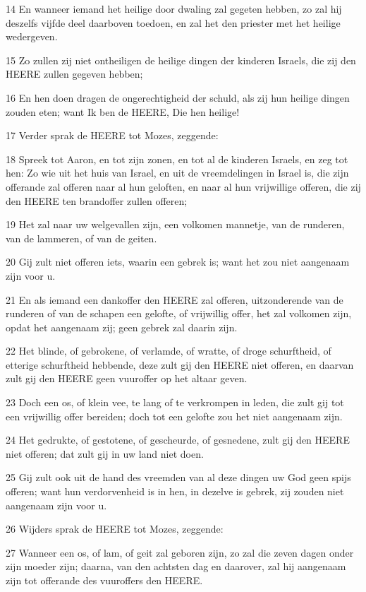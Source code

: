 \par 14 En wanneer iemand het heilige door dwaling zal gegeten hebben, zo zal hij deszelfs vijfde deel daarboven toedoen, en zal het den priester met het heilige wedergeven.
\par 15 Zo zullen zij niet ontheiligen de heilige dingen der kinderen Israels, die zij den HEERE zullen gegeven hebben;
\par 16 En hen doen dragen de ongerechtigheid der schuld, als zij hun heilige dingen zouden eten; want Ik ben de HEERE, Die hen heilige!
\par 17 Verder sprak de HEERE tot Mozes, zeggende:
\par 18 Spreek tot Aaron, en tot zijn zonen, en tot al de kinderen Israels, en zeg tot hen: Zo wie uit het huis van Israel, en uit de vreemdelingen in Israel is, die zijn offerande zal offeren naar al hun geloften, en naar al hun vrijwillige offeren, die zij den HEERE ten brandoffer zullen offeren;
\par 19 Het zal naar uw welgevallen zijn, een volkomen mannetje, van de runderen, van de lammeren, of van de geiten.
\par 20 Gij zult niet offeren iets, waarin een gebrek is; want het zou niet aangenaam zijn voor u.
\par 21 En als iemand een dankoffer den HEERE zal offeren, uitzonderende van de runderen of van de schapen een gelofte, of vrijwillig offer, het zal volkomen zijn, opdat het aangenaam zij; geen gebrek zal daarin zijn.
\par 22 Het blinde, of gebrokene, of verlamde, of wratte, of droge schurftheid, of etterige schurftheid hebbende, deze zult gij den HEERE niet offeren, en daarvan zult gij den HEERE geen vuuroffer op het altaar geven.
\par 23 Doch een os, of klein vee, te lang of te verkrompen in leden, die zult gij tot een vrijwillig offer bereiden; doch tot een gelofte zou het niet aangenaam zijn.
\par 24 Het gedrukte, of gestotene, of gescheurde, of gesnedene, zult gij den HEERE niet offeren; dat zult gij in uw land niet doen.
\par 25 Gij zult ook uit de hand des vreemden van al deze dingen uw God geen spijs offeren; want hun verdorvenheid is in hen, in dezelve is gebrek, zij zouden niet aangenaam zijn voor u.
\par 26 Wijders sprak de HEERE tot Mozes, zeggende:
\par 27 Wanneer een os, of lam, of geit zal geboren zijn, zo zal die zeven dagen onder zijn moeder zijn; daarna, van den achtsten dag en daarover, zal hij aangenaam zijn tot offerande des vuuroffers den HEERE.
